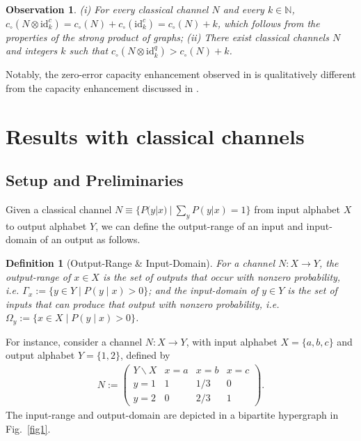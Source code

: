 \documentclass[12pt,a4paper]{article}
\newtheorem{observation}{Observation}
\newtheorem{definition}{Definition}
\begin{document}
\begin{observation}\label{obs2}
(i) For every classical channel $N$ and every $k\in\mathbb{N}$, $c_\circ(N\otimes \mathrm{id}^c_k)= c_\circ(N)+c_\circ(\mathrm{id}^c_k)=c_\circ(N)+k$, which follows from the properties of the strong product of graphs; (ii) There exist classical channels $N$ and integers $k$ such that $c_\circ(N\otimes \mathrm{id}^q_k) > c_\circ(N)+k$.
\end{observation}

\noindent Notably, the zero-error capacity enhancement observed in \cite{Ambuj2026} is qualitatively different from the capacity enhancement discussed in \cite{Cubitt2010,Cubitt2011,Prevedel2011,Yadavalli2022,Agarwal2026}. 

\section{Results with classical channels}\label{sec3}
\subsection{Setup and Preliminaries}
Given a classical channel $N\equiv\{P(y|x)~|~\sum_yP(y|x)=1\}$ from input alphabet $X$ to output alphabet $Y$, we can define the output-range of an input and input-domain of an output as follows.
\begin{definition}[Output-Range \& Input-Domain]\label{def4}
For a channel $N : X \to Y$, the output-range of $x \in X$ is the set of outputs that occur with nonzero probability, i.e. $\Gamma_x := \{ y \in Y \mid P(y \mid x) > 0 \}$; and the input-domain of $y \in Y$ is the set of inputs that can produce that output with nonzero probability, i.e. $\Omega_y := \{ x \in X \mid P(y \mid x) > 0 \}$.
\end{definition}

\noindent For instance, consider a channel $N:X\to Y$, with input alphabet $X=\{a,b,c\}$ and output alphabet $Y=\{1,2\}$, defined by 
\begin{align}
N:=\left(
\begin{array}{c||c|c|c}
Y\backslash X         & x=a & x=b        & x=c \\
\hline\hline
y=1      & 1   & 1/3 & 0   \\\hline
y=2      & 0   & 2/3 & 1
\end{array}
\right). \label{Ex-Sup}
\end{align}
\noindent The input-range and output-domain are depicted in a bipartite hypergraph in Fig.~\ref{fig1}.
\end{document}
